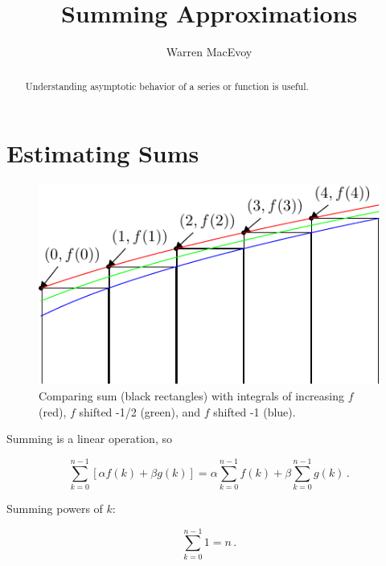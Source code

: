 \documentclass{tufte-handout}
\title{Summing Approximations}
\author[Warren MacEvoy]{Warren MacEvoy}
\theoremstyle{definition}
\theoremstyle{example}
\theoremstyle{theorem}
\begin{document}
\maketitle%

\begin{abstract}
\noindent Understanding asymptotic behavior of a series or function is useful.
\end{abstract}


\section{Estimating Sums}

\begin{figure}
\begin{center}
\includegraphics[width=1.00\linewidth]{graphics/intsum.pdf}
\end{center}
\caption{\label{fig:intmid}Comparing sum (black rectangles) with integrals of increasing $f$ (red), $f$ shifted -1/2 (green), and $f$ shifted -1 (blue).}
\label{fig:intmid}
\end{figure}

Summing is a linear operation, so

\begin{equation}
  \sum_{k=0}^{n-1} \left[ \alpha f(k) + \beta g(k) \right] = \alpha \sum_{k=0}^{n-1} f(k) + \beta \sum_{k=0}^{n-1} g(k) \,.
\end{equation}

Summing powers of $k$:

\begin{equation}
  \sum_{k=0}^{n-1} 1 = n \,.
\end{equation}
\end{document}
